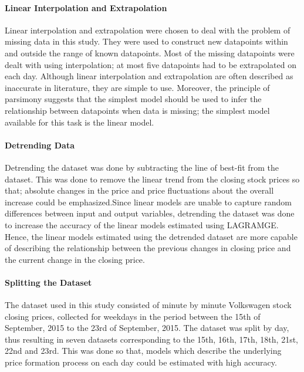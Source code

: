 \documentclass[13pt]{report}
\begin{document}
\paragraph{Linear Interpolation and Extrapolation} \hfill \break
Linear interpolation and extrapolation were chosen to deal with the problem of missing data in this study. They were used to construct new datapoints within and outside the range of known datapoints.  Most of the missing datapoints were dealt with using interpolation; at most five datapoints had to be extrapolated on each day. Although linear interpolation and extrapolation are often described as inaccurate in literature, they are simple to use. Moreover, the principle of parsimony suggests that the simplest model should be used to infer the relationship between datapoints when data is missing; the simplest model available for this task is the linear model.




\paragraph{Detrending Data} \hfill \break Detrending the dataset was done by subtracting the line of best-fit from the dataset. This was done to remove the linear trend from the closing stock prices so that; absolute changes in the price and  price fluctuations about the overall increase could be emphasized.Since linear models are unable to capture random differences between input and output variables, detrending the dataset was  done to increase the accuracy of the linear models estimated using LAGRAMGE. Hence, the linear models estimated using the detrended dataset are more capable of describing the relationship between the previous changes in closing price and the current change in the closing price.

\paragraph{Splitting the Dataset}\hfill \break
The dataset used in this study consisted of minute by minute Volkswagen stock closing prices, collected for weekdays in the period between the 15th of September, 2015 to the 23rd of September, 2015. The dataset was split by day, thus resulting in seven datasets corresponding to the 15th, 16th, 17th, 18th, 21st, 22nd and 23rd. This was done so that, models which describe the underlying price formation process on each day could be estimated with high accuracy.  
\end{document}
